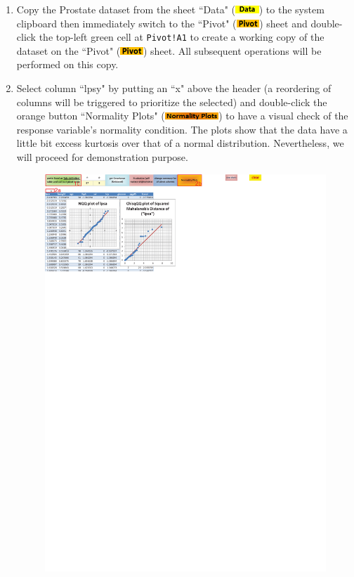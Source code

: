 \documentclass[article]{jss}
\newcommand{\shtData}{``Data" (\includegraphics[height=8pt, keepaspectratio=true]{DataSheetTab_png}) }
\newcommand{\shtPivot}{``Pivot" (\includegraphics[height=8pt, keepaspectratio=true]{PivotSheetTab_png}) }
\begin{document}
        \begin{enumerate}
          
          \item Copy the Prostate dataset from the sheet \shtData to the system clipboard then immediately switch to the \shtPivot sheet and double-click the top-left green cell at \texttt{Pivot!A1} to create a working copy of the dataset on the \shtPivot sheet. All subsequent operations will be performed on this copy.
          \item Select column ``lpsy" by putting an ``x" above the header (a reordering of columns will be triggered to prioritize the selected) and double-click the orange button ``Normality Plots" (\includegraphics[height=8pt, keepaspectratio=true]{PivotNormalityPlotButton_png}) to have a visual check of the response variable's normality condition. The plots show that the data have a little bit excess kurtosis over that of a normal distribution. Nevertheless, we will proceed for demonstration purpose.
          \begin{figure}[!tbh]
                \includegraphics[width=\linewidth, keepaspectratio=true]{img/Prostate_normalityPlots_markup}

\end{figure}
\end{enumerate}
\end{document}
